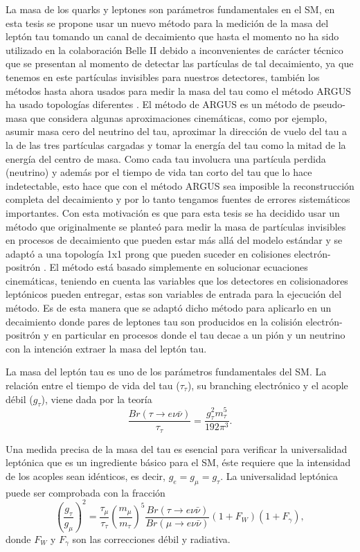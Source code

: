 La masa de los quarks y leptones son parámetros fundamentales en el SM, en esta tesis se propone usar un nuevo método para la medición de la masa del leptón tau tomando un canal de decaimiento que hasta el momento no ha sido utilizado en la colaboración Belle II debido a inconvenientes de carácter técnico que se presentan al momento de detectar las partículas de tal decaimiento, ya que tenemos en este partículas invisibles para nuestros detectores, también los métodos hasta ahora usados para medir la masa del tau como el método ARGUS ha usado topologías diferentes \cite{Albrecht1995}. El método de ARGUS es un método de pseudo-masa que considera algunas aproximaciones cinemáticas, como por ejemplo, asumir masa cero del neutrino del tau, aproximar la dirección de vuelo del tau a la de las tres partículas cargadas y tomar la energía del tau como la mitad de la energía del centro de masa. Como cada tau involucra una partícula perdida (neutrino) y además por el tiempo de vida tan corto del tau que lo hace indetectable, esto hace que con el método ARGUS sea imposible la reconstrucción completa del decaimiento y por lo tanto tengamos fuentes de errores sistemáticos importantes. Con esta motivación es que para esta tesis se ha decidido usar un método que originalmente se planteó para medir la masa de partículas invisibles en procesos de decaimiento que pueden estar más allá del modelo estándar y se adaptó a una topología 1x1 prong que pueden suceder en colisiones electrón-positrón \cite{PhysRevD.95.075037}. El método está basado simplemente en solucionar ecuaciones cinemáticas, teniendo en cuenta las variables que los detectores en colisionadores leptónicos pueden entregar, estas son variables de entrada para la ejecución del método. Es de esta manera que se adaptó dicho método para aplicarlo en un decaimiento donde pares de leptones tau son producidos en la colisión electrón-positrón y en particular en procesos donde el tau decae a un pión y un neutrino con la intención extraer la masa del leptón tau. 

La masa del leptón tau es uno de los parámetros fundamentales del SM. La relación entre el tiempo de vida del tau (\(\tau_{\tau}\)), su branching electrónico y el acople débil (\(g_{\tau}\)), viene dada por la teoría
\begin{equation}
    \frac{Br(\tau\rightarrow e\nu\bar{\nu})}{\tau_{\tau}}=\frac{g_{\tau}^2m_{\tau}^5}{192\pi^3}.
\end{equation}

Una medida precisa de la masa del tau es esencial para verificar la universalidad leptónica que es un ingrediente básico para el SM, éste requiere que la intensidad de los acoples sean idénticos, es decir, \(g_{e}=g_{\mu}=g_{\tau}\). La universalidad leptónica puede ser comprobada con la fracción
\begin{equation}
    \left(\frac{g_{\tau}}{g_{\mu}}\right)^2=\frac{\tau_{\mu}}{\tau_{\tau}}\left(\frac{m_{\mu}}{m_{\tau}}\right)^5\frac{Br(\tau\rightarrow e\nu\bar{\nu})}{Br(\mu\rightarrow e\nu\bar{\nu})}(1+F_{W})(1+F_{\gamma}),
\end{equation}
donde \(F_{W}\) y \(F_{\gamma}\) son las correcciones débil y radiativa.

